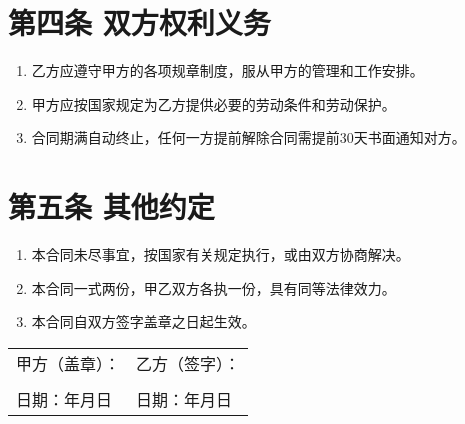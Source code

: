 \documentclass[UTF8]{ctexart}
\begin{document}
\section*{第四条 双方权利义务}
\begin{enumerate}
    \item 乙方应遵守甲方的各项规章制度，服从甲方的管理和工作安排。
    \item 甲方应按国家规定为乙方提供必要的劳动条件和劳动保护。
    \item 合同期满自动终止，任何一方提前解除合同需提前30天书面通知对方。
\end{enumerate}

\section*{第五条 其他约定}
\begin{enumerate}
    \item 本合同未尽事宜，按国家有关规定执行，或由双方协商解决。
    \item 本合同一式两份，甲乙双方各执一份，具有同等法律效力。
    \item 本合同自双方签字盖章之日起生效。
\end{enumerate}

\vspace{2cm}
\noindent
\begin{tabular}{p{8cm}p{8cm}}
甲方（盖章）： & 乙方（签字）： \\
\underline{\hspace{6cm}} & \underline{\hspace{6cm}} \\
日期：\underline{\hspace{2cm}}年\underline{\hspace{1cm}}月\underline{\hspace{1cm}}日 & 日期：\underline{\hspace{2cm}}年\underline{\hspace{1cm}}月\underline{\hspace{1cm}}日 \\
\end{tabular}
\end{document}
